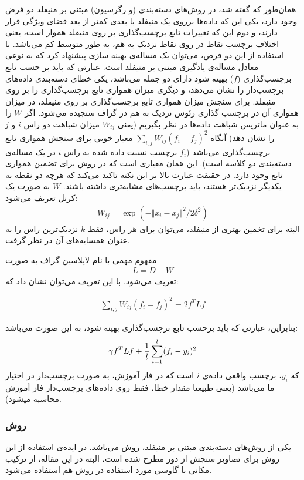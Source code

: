 \documentclass[11pt]{article}
\begin{document}
همان‌طور که گفته شد، در روش‌های دسته‌بندی (و رگرسیون) مبتنی بر منیفلد دو فرض وجود دارد، یکی این که داده‌ها برروی یک منیفلد با بعدی کمتر از بعد فضای ویژگی قرار دارند، و دوم این که تغییرات تابع برچسب‌گذاری بر روی منیفلد هموار است، یعنی اختلاف برچسب نقاط در روی نقاط نزدیک به هم، به طور متوسط کم می‌باشد.  با استفاده از این دو فرض، می‌توان یک مساله‌ی بهینه سازی پیشنهاد کرد که به نوعی معادل مساله‌ی یادگیری مبتنی بر منیفلد است. عبارتی که باید بر جسب تابع برچسب‌گذاری ($f$) بهینه شود دارای دو جمله می‌باشد، یکی خطای دسته‌بندی داده‌های برچسب‌دار را نشان می‌دهد، و دیگری میزان همواری تابع برچسب‌گذاری را بر روی منیفلد. برای سنجش میزان همواری تابع برچسب‌گذاری بر روی منیفلد، در میزان همواری آن در برچسب گذاری رئوس نزدیک به هم در گراف سنجیده می‌شود. اگر $W$ را به عنوان ماتریس شباهت داده‌ها در نظر بگیریم (یعنی  $W_{ij}$ میزان شباهت دو راس $i$ و $j$ را نشان دهد) آنگاه  $\displaystyle \sum_{i,j}W_{ij}(f_i-f_j)^2$ معیار خوبی برای سنجش همواری تابع برچسب‌گذاری می‌باشد ($f_i$ برچسب نسبت داده شده به راس $i$ در یک مساله‌ی دسته‌بندی دو کلاسه است). این همان معیاری است که در روش \regularization{} \tikhonov{} برای تضمین همواری تابع وجود دارد. در حقیقت عبارت بالا بر این نکته تاکید می‌کند که هرچه دو نقطه به یکدیگر نزدیک‌تر هستند، باید برچسب‌های مشابه‌تری داشته باشند.
$W$ به صورت یک کرنل  تعریف می‌شود:
\begin{eqnarray}
W_{ij} = \exp(-\Vert x_i - x_j \Vert ^ 2 / 2 \delta^2)
\end{eqnarray}
البته برای تخمین بهتری از منیفلد، می‌توان برای هر راس، فقط  $k$ نزدیک‌ترین راس را به عنوان همسایه‌های آن در نظر گرفت.


مفهوم مهمی با نام لاپلاسین گراف به صورت
\begin{eqnarray}
L=D-W
\end{eqnarray}
 تعریف می‌شود. با این تعریف می‌توان نشان داد که:

\begin{eqnarray}
\displaystyle \sum_{i,j}W_{ij}(f_i-f_j)^2 = 2f^T L f
\end{eqnarray}

بنابراین، عبارتی که باید برحسب تابع برچسب‌گذاری بهینه شود، به این صورت می‌باشد:
\begin{eqnarray} \label{tikhonov_OPT}
\gamma f^T L f +{1\over l}\sum_{i=1}^l( f_i - y_i )^2
\end{eqnarray}
که $y_i$، برچسب واقعی داده‌ی $i$  است که در فاز آموزش، به صورت برچسب‌دار در اختیار ما می‌باشد (یعنی طبیعتا مقدار خطا، فقط روی داده‌های برچسب‌دار فاز آموزش محاسبه میشود).

\subsubsection*{روش \LGC{}}
یکی از روش‌های دسته‌بندی مبتنی بر منیفلد، روش \LGC{} می‌باشد.
در \cite{Camps_valls_Graph_Based} ایده‌ی استفاده از این روش برای تصاویر \hyperspec{} سنجش از دور مطرح شده است، البته در این مقاله، از ترکیب  مکانی با  گاوسی مورد استفاده در روش \LGC{} هم استفاده می‌شود. 
\end{document}
